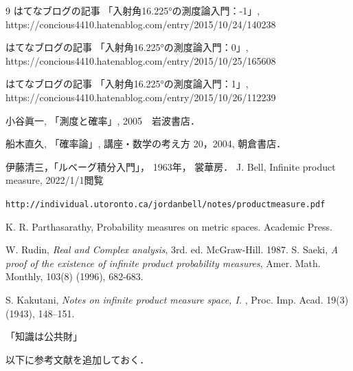 \documentclass[leqno, a4paper, 12pt]{jsarticle}
\begin{document}
	
\begin{thebibliography}{9}
はてなブログの記事
「入射角16.225°の測度論入門：-1」, 
https://concious4410.hatenablog.com/entry/2015/10/24/140238

はてなブログの記事
「入射角16.225°の測度論入門：0」, 
https://concious4410.hatenablog.com/entry/2015/10/25/165608

はてなブログの記事
「入射角16.225°の測度論入門：1」, 
https://concious4410.hatenablog.com/entry/2015/10/26/112239




小谷眞一, 「測度と確率」, 2005　岩波書店．

船木直久, 「確率論」, 
講座・数学の考え方 20，2004, 朝倉書店．

 伊藤清三，「ルベーグ積分入門」，
1963年，
裳華房．
J. Bell, 
Infinite product measure, 
2022/1/1閲覧

\verb|http://individual.utoronto.ca/jordanbell/notes/productmeasure.pdf|

K. R. Parthasarathy,  Probability measures on metric spaces. 
Academic Press. 



 W. 
Rudin, 
\textit{Real and Complex analysis}, 
3rd. ed. McGraw-Hill. 1987. 
S. Saeki, 
\textit{A proof of the existence of infinite product probability measures}, 
Amer. Math. Monthly, 
103(8) (1996), 682-683. 

S. Kakutani, 
\textit{Notes on infinite product measure space, I. }, 
Proc. Imp. Acad. 19(3) (1943), 
148--151. 
\end{thebibliography}

「知識は公共財」



以下に参考文献を追加しておく．
\nocite{*}






			
\end{document}
